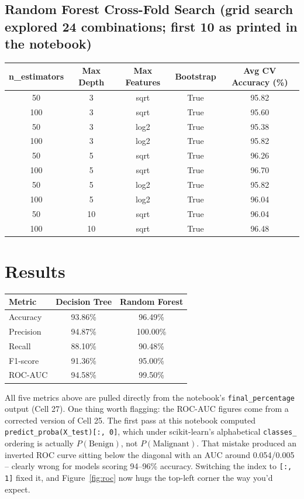 \documentclass[12pt,a4paper]{article}
\begin{document}
\subsection*{Random Forest Cross-Fold Search (grid search explored 24 combinations; first 10 as printed in the notebook)}
\begin{longtable}{ccccc}
\toprule
n\_estimators & Max Depth & Max Features & Bootstrap & Avg CV Accuracy (\%) \\
\midrule
50  & 3  & sqrt & True & 95.82 \\
100 & 3  & sqrt & True & 95.60 \\
50  & 3  & log2 & True & 95.38 \\
100 & 3  & log2 & True & 95.82 \\
50  & 5  & sqrt & True & 96.26 \\
100 & 5  & sqrt & True & 96.70 \\
50  & 5  & log2 & True & 95.82 \\
100 & 5  & log2 & True & 96.04 \\
50  & 10 & sqrt & True & 96.04 \\
100 & 10 & sqrt & True & 96.48 \\
\bottomrule
\end{longtable}



\section{Results}

\begin{tabular}{lcc}
\toprule
Metric & Decision Tree & Random Forest \\
\midrule
Accuracy  & 93.86\% & 96.49\% \\
Precision & 94.87\% & 100.00\% \\
Recall    & 88.10\% & 90.48\% \\
F1-score  & 91.36\% & 95.00\% \\
ROC-AUC   & 94.58\% & 99.50\% \\
\bottomrule
\end{tabular}
 
\vspace{4pt}
\noindent All five metrics above are pulled directly from the notebook's \texttt{final\_percentage} output (Cell 27). One thing worth flagging: the ROC-AUC figures come from a corrected version of Cell 25. The first pass at this notebook computed \texttt{predict\_proba(X\_test)[:, 0]}, which under scikit-learn's alphabetical \texttt{classes\_} ordering is actually $P(\text{Benign})$, not $P(\text{Malignant})$. That mistake produced an inverted ROC curve sitting below the diagonal with an AUC around 0.054/0.005 -- clearly wrong for models scoring 94--96\% accuracy. Switching the index to \texttt{[:, 1]} fixed it, and Figure~\ref{fig:roc} now hugs the top-left corner the way you'd expect.
\end{document}
